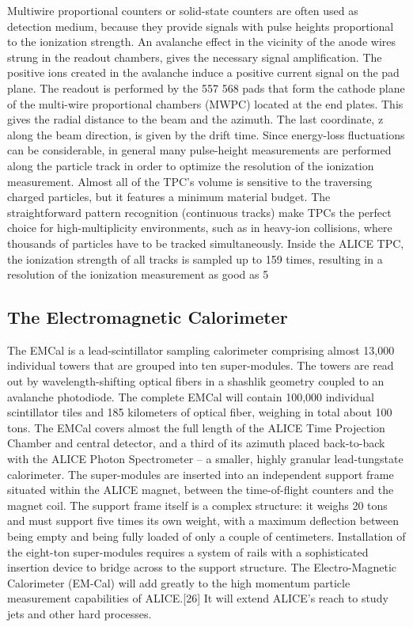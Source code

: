 Multiwire proportional counters or solid-state counters are often used as detection medium, because they provide signals with pulse heights proportional to the ionization strength. An avalanche effect in the vicinity of the anode wires strung in the readout chambers, gives the necessary signal amplification. The positive ions created in the avalanche induce a positive current signal on the pad plane. The readout is performed by the 557 568 pads that form the cathode plane of the multi-wire proportional chambers (MWPC) located at the end plates. This gives the radial distance to the beam and the azimuth. The last coordinate, z along the beam direction, is given by the drift time. Since energy-loss fluctuations can be considerable, in general many pulse-height measurements are performed along the particle track in order to optimize the resolution of the ionization measurement.
Almost all of the TPC's volume is sensitive to the traversing charged particles, but it features a minimum material budget. The straightforward pattern recognition (continuous tracks) make TPCs the perfect choice for high-multiplicity environments, such as in heavy-ion collisions, where thousands of particles have to be tracked simultaneously. Inside the ALICE TPC, the ionization strength of all tracks is sampled up to 159 times, resulting in a resolution of the ionization measurement as good as 5%


\subsection{The Electromagnetic Calorimeter}
The EMCal is a lead-scintillator sampling calorimeter comprising almost 13,000 individual towers that are grouped into ten super-modules. The towers are read out by wavelength-shifting optical fibers in a shashlik geometry coupled to an avalanche photodiode. The complete EMCal will contain 100,000 individual scintillator tiles and 185 kilometers of optical fiber, weighing in total about 100 tons.
The EMCal covers almost the full length of the ALICE Time Projection Chamber and central detector, and a third of its azimuth placed back-to-back with the ALICE Photon Spectrometer – a smaller, highly granular lead-tungstate calorimeter.
The super-modules are inserted into an independent support frame situated within the ALICE magnet, between the time-of-flight counters and the magnet coil. The support frame itself is a complex structure: it weighs 20 tons and must support five times its own weight, with a maximum deflection between being empty and being fully loaded of only a couple of centimeters. Installation of the eight-ton super-modules requires a system of rails with a sophisticated insertion device to bridge across to the support structure.
The Electro-Magnetic Calorimeter (EM-Cal) will add greatly to the high momentum particle measurement capabilities of ALICE.[26] It will extend ALICE's reach to study jets and other hard processes.


